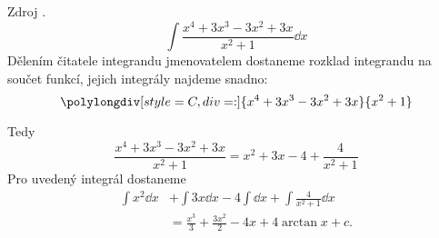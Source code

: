\begin{mdframed}[style=mdexam]
  \begin{example}\label{MAI:exam121}
    Zdroj \cite[s.~29]{Knichal}.
    \begin{equation}\label{MA:int_ex_01}
      \int{\frac{x^4+3x^3-3x^2+3x}{x^2+1}\dd{x}}
    \end{equation}
    Dělením čitatele integrandu jmenovatelem  dostaneme rozklad integrandu na součet funkcí,
    jejich integrály najdeme snadno:
    \begin{equation*}
      \polylongdiv[style=C,div=:]{x^4+3x^3-3x^2+3x}{x^2+1}
    \end{equation*}

    Tedy
    \begin{equation*}
      \frac{x^4+3x^3-3x^2+3x}{x^2+1} = x^2+3x-4+\frac{4}{x^2+1}  
    \end{equation*}
    Pro uvedený integrál dostaneme
    \begin{align*}
      \int{x^2}\dd{x} &+\int{3x}\dd{x}-4\int\dd{x}+\int{\frac{4}{x^2+1}\dd{x}} \\
                      &= \frac{x^3}{3}+\frac{3x^2}{2}-4x+4\arctan x + c.
    \end{align*}
  \end{example}
\end{mdframed}